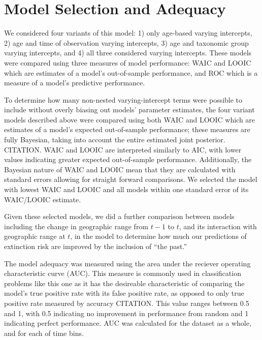 \documentclass[12pt,letterpaper]{article}
\begin{document}
\section{Model Selection and Adequacy}

We considered four variants of this model: 1) only age-based varying intercepts, 2) age and time of observation varying intercepts, 3) age and taxonomic group varying intercepts, and 4) all three considered varying intercepts. These models were compared using three measures of model performance: WAIC and LOOIC which are estimates of a model's out-of-sample performance, and ROC which is a measure of a model's predictive performance.

To determine how many non-nested varying-intercept terms were possible to include without overly biasing out models' parameter estimates, the four variant models described above were compared using both WAIC and LOOIC which are estimates of a model's expected out-of-sample performance; these measures are fully Bayesian, taking into account the entire estimated joint posterior. CITATION. WAIC and LOOIC are interpreted similarly to AIC, with lower values indicating greater expected out-of-sample performance. Additionally, the Bayesian nature of WAIC and LOOIC mean that they are calculated with standard errors allowing for straight forward comparisons. We selected the model with lowest WAIC and LOOIC and all models within one standard error of its WAIC/LOOIC estimate.

Given these selected models, we did a further comparison between models including the change in geographic range from \(t - 1\) to \(t\), and its interaction with geographic range at \(t\), in the model to determine how much our predictions of extinction risk are improved by the inclusion of ``the past.''

The model adequacy was measured using the area under the reciever operating characteristic curve (AUC). This measure is commonly used in classification problems like this one as it has the desireable characteristic of comparing the model's true positive rate with its false positive rate, as opposed to only true positive rate measured by accuracy CITATION. This value ranges between 0.5 and 1, with 0.5 indicating no improvement in performance from random and 1 indicating perfect performance. AUC was calculated for the dataset as a whole, and for each of time bins.
\end{document}
